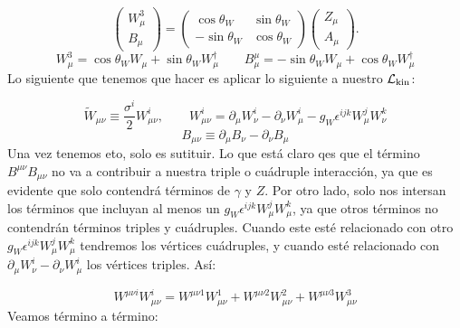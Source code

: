 \begin{equation}
\begin{pmatrix}
W_\mu^{3} \\[4pt]
B_\mu
\end{pmatrix}
=
\begin{pmatrix}
\cos\theta_W & \sin\theta_W \\[4pt]
-\sin\theta_W & \cos\theta_W
\end{pmatrix}
\begin{pmatrix}
Z_\mu \\[4pt]
A_\mu
\end{pmatrix}.
\end{equation}
\begin{equation}
	W^3_{\mu} =  \cos \theta_W W_\mu +\sin \theta_W W_\mu^\dagger \qquad 
	B^\mu_{\mu} = -\sin \theta_W W_\mu +\cos \theta_W W_\mu^\dagger
\end{equation}
Lo siguiente que tenemos que hacer es aplicar lo siguiente a nuestro $\mathcal{L}_{\text{kin}}$:

\begin{equation}
\widetilde{W}_{\mu\nu} \equiv \frac{\sigma^i}{2} W^i_{\mu\nu}, 
\qquad 
W^i_{\mu\nu} = \partial_\mu W^i_\nu - \partial_\nu W^i_\mu - g_W \epsilon^{ijk} W^j_\mu W^k_\nu
\end{equation}
\begin{equation}
B_{\mu\nu} \equiv \partial_\mu B_\nu - \partial_\nu B_\mu
\end{equation}
Una vez tenemos eto, solo es sutituir. Lo que está claro qes que el término $B^{\mu \nu} B_{\mu \nu} $ no va a contribuir a nuestra triple o cuádruple interacción, ya que es evidente que solo contendrá términos de $\gamma$ y $Z$. Por otro lado, solo nos intersan los términos que incluyan al menos un $g_W \epsilon^{ijk} W_{\mu}^j W_{\mu}^k$, ya que otros términos no contendrán términos triples y cuádruples. Cuando este esté relacionado con otro $g_W \epsilon^{ijk} W_{\mu}^j W_{\mu}^k$ tendremos los vértices cuádruples, y cuando esté relacionado con $\partial_\mu W^i_\nu-\partial_\nu W_\mu^i$ los vértices triples. Así: 

\begin{equation}
	W^{\mu \nu i} W_{\mu \nu}^i = 
	W^{\mu \nu 1} W_{\mu \nu}^1 +
	W^{\mu \nu 2} W_{\mu \nu}^2 +
	W^{\mu \nu 3} W_{\mu \nu}^3
\end{equation}
Veamos término a término: 

